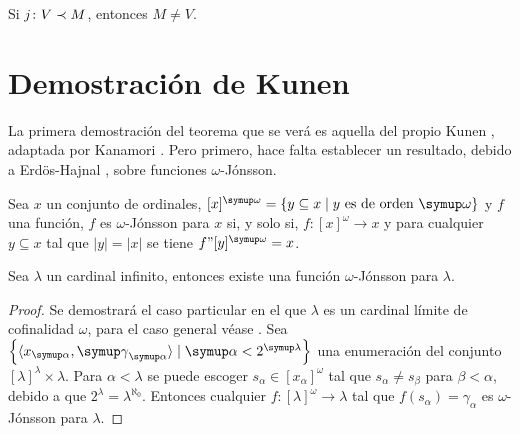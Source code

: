 \begin{teo}[Kunen]\label{teo:kunen}
    Si $j\colon V\prec M$, entonces $M\neq V$.
\end{teo}

\section{Demostración de Kunen}

La primera demostración del teorema que se verá es aquella
del propio Kunen \autocite{kunen_elementary_1971}, adaptada
por Kanamori \autocite{kanamori_higher_2009}. Pero primero,
hace falta establecer un resultado, debido a Erdös-Hajnal \autocite{erdos_problem_1966},
sobre funciones $\omega$-Jónsson.

\begin{defi}
    Sea $x$ un conjunto de ordinales, $[x]^\omega = \set{y\subseteq x\mid \text{$y$ es de orden $\omega$}}$
    y $f$ una función,
    $f$ es $\omega$-Jónsson para $x$ si, y solo si,
    $f\colon [x]^\omega\to x$ y para cualquier $y\subseteq x$
    tal que $|y|=|x|$ se tiene $f"[y]^\omega = x$.
\end{defi}

\begin{teo}\label{teo:jonsson}
    Sea $\lambda$ un cardinal infinito, entonces existe una función $\omega$-Jónsson para $\lambda$.
\end{teo}

\begin{proof}
    Se demostrará el caso particular en el que $\lambda$ es un cardinal límite de cofinalidad $\omega$,
    para el caso general véase \autocite[Teorema 23.13]{kanamori_higher_2009}.
    Sea $\set{\op{x_\alpha,\gamma_\alpha}\mid \alpha < 2^\lambda}$ una enumeración del conjunto $[\lambda]^\lambda\times\lambda$.
    Para $\alpha<\lambda$ se puede escoger $s_\alpha\in[x_\alpha]^\omega$ tal que $s_\alpha\neq s_\beta$ para $\beta<\alpha$,
    debido a que $2^\lambda=\lambda^{\aleph_0}$. Entonces cualquier $f\colon[\lambda]^\omega\to\lambda$
    tal que $f(s_\alpha)=\gamma_\alpha$ es $\omega$-Jónsson para $\lambda$.
\end{proof}

